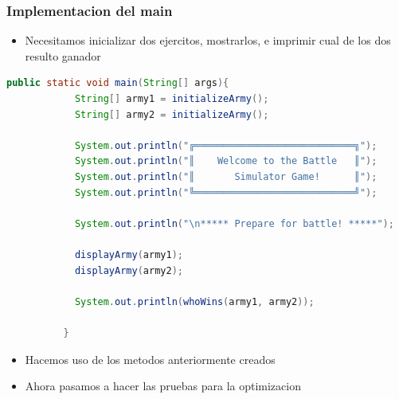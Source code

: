 \documentclass{article}
\begin{document}
        \subsubsection{Implementacion del main}
        \begin{itemize}
            \item Necesitamos inicializar dos ejercitos, mostrarlos, e imprimir cual de los dos resulto ganador
        \end{itemize}
        \begin{lstlisting}[language=java, caption={Metodo main() de VideoJuego.java}]
          public static void main(String[] args){
            String[] army1 = initializeArmy(); 
            String[] army2 = initializeArmy();
        
            System.out.println("╔════════════════════════════╗");
            System.out.println("║    Welcome to the Battle   ║");
            System.out.println("║       Simulator Game!      ║");
            System.out.println("╚════════════════════════════╝");
            
            System.out.println("\n***** Prepare for battle! *****");
        
            displayArmy(army1);
            displayArmy(army2);
        
            System.out.println(whoWins(army1, army2));
        
          }
        \end{lstlisting}
        \begin{itemize}
            \item Hacemos uso de los metodos anteriormente creados
            \item Ahora pasamos a hacer las pruebas para la optimizacion
        \end{itemize}
\end{document}
